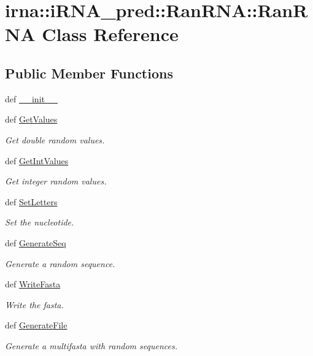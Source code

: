 \hypertarget{classirna_1_1iRNA__pred_1_1RanRNA_1_1RanRNA}{
\section{irna\-:\-:i\-R\-N\-A\-\_\-pred\-:\-:\-Ran\-R\-N\-A\-:\-:\-Ran\-R\-N\-A \-Class \-Reference}
\label{classirna_1_1iRNA__pred_1_1RanRNA_1_1RanRNA}
}
\subsection*{\-Public \-Member \-Functions}
\begin{DoxyCompactItemize}
\item 
def \hyperlink{classirna_1_1iRNA__pred_1_1RanRNA_1_1RanRNA_abf735b3cf4ed3fc0fa217c5fa7dd554f}{\-\_\-\-\_\-init\-\_\-\-\_\-}
\item 
def \hyperlink{classirna_1_1iRNA__pred_1_1RanRNA_1_1RanRNA_a21e2025019c108c0603d30c2b2ef149d}{\-Get\-Values}
\begin{DoxyCompactList}\small\item\em \-Get double random values. \end{DoxyCompactList}\item 
def \hyperlink{classirna_1_1iRNA__pred_1_1RanRNA_1_1RanRNA_a043f709bbf70011adcc4f379eebc76a4}{\-Get\-Int\-Values}
\begin{DoxyCompactList}\small\item\em \-Get integer random values. \end{DoxyCompactList}\item 
def \hyperlink{classirna_1_1iRNA__pred_1_1RanRNA_1_1RanRNA_af11aaf6f9d7ef84d4113f466562e6e1f}{\-Set\-Letters}
\begin{DoxyCompactList}\small\item\em \-Set the nucleotide. \end{DoxyCompactList}\item 
def \hyperlink{classirna_1_1iRNA__pred_1_1RanRNA_1_1RanRNA_a3f2d77c08804cf1831cb4f672cd10055}{\-Generate\-Seq}
\begin{DoxyCompactList}\small\item\em \-Generate a random sequence. \end{DoxyCompactList}\item 
def \hyperlink{classirna_1_1iRNA__pred_1_1RanRNA_1_1RanRNA_ae83fc6275364d0d50bde46c4f7c2d90c}{\-Write\-Fasta}
\begin{DoxyCompactList}\small\item\em \-Write the fasta. \end{DoxyCompactList}\item 
def \hyperlink{classirna_1_1iRNA__pred_1_1RanRNA_1_1RanRNA_a59565cbdcb0f4035be4e7e1f3a25e242}{\-Generate\-File}
\begin{DoxyCompactList}\small\item\em \-Generate a multifasta with random sequences. \end{DoxyCompactList}\end{DoxyCompactItemize}
